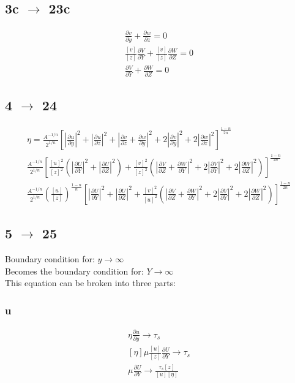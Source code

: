 \documentclass[10pt, letterpaper, twoside]{article}
\newcommand{\pd}[2]{\frac{\partial#1}{\partial#2}}
\begin{document}
	\subsection{3c $ \rightarrow $ 23c}
	\begin{gather*}
		\pd{v}{y} + \pd{w}{z} = 0 \tag{3c} \\
		\frac{\left[v\right]}{\left[z\right]}\pd{V}{Y} + \frac{\left[v\right]}{\left[z\right]}\pd{W}{Z} = 0\\
		\pd{V}{Y} + \pd{W}{Z} = 0 \tag{23c}
	\end{gather*}
	\subsection{4 $ \rightarrow $ 24}
	\begin{gather*}
		\eta = \frac{A^{-1/n}}{2^{1/n}}\left[\left|\pd{u}{y}\right|^2 + \left|\pd{u}{z}\right|^2 + \left|\pd{v}{z} + \pd{w}{y}\right|^2 + 2\left|\pd{v}{y}\right|^2 + 2\left|\pd{w}{z}\right|^2\right]^{\frac{1-n}{2n}} \tag{4} \\
		\frac{A^{-1/n}}{2^{1/n}}\left[\frac{\left[u\right]^2}{\left[z\right]^2}\left(\left|\pd{U}{Y}\right|^2 + \left|\pd{U}{Z}\right|^2\right) + \frac{\left[v\right]^2}{\left[z\right]^2}\left(\left|\pd{V}{Z} + \pd{W}{Y}\right|^2 + 2\left|\pd{V}{Y}\right|^2 + 2\left|\pd{W}{Z}\right|^2\right)\right]^{\frac{1-n}{2n}}\\
		\frac{A^{-1/n}}{2^{1/n}}\left(\frac{\left[u\right]}{\left[z\right]}\right)^{\frac{1-n}{n}}\left[\left|\pd{U}{Y}\right|^2 + \left|\pd{U}{Z}\right|^2 + \frac{\left[v\right]^2}{\left[u\right]^2}\left(\left|\pd{V}{Z} + \pd{W}{Y}\right|^2 + 2\left|\pd{V}{Y}\right|^2 + 2\left|\pd{W}{Z}\right|^2\right)\right]^{\frac{1-n}{2n}} \tag{4$'$}
	\end{gather*}
	\subsection{5 $ \rightarrow $ 25}
	Boundary condition for: $ y\rightarrow\infty $\\
	Becomes the boundary condition for: $ Y\rightarrow\infty$\\
	This equation can be broken into three parts:
	\subsubsection{u}
	\begin{gather*}
		\eta\pd{u}{y}\rightarrow\tau_s \tag{5a} \\
		\left[\eta\right]\mu\frac{\left[u\right]}{\left[z\right]}\pd{U}{Y}\rightarrow\tau_s\\
		\mu\pd{U}{Y}\rightarrow\frac{\tau_s\left[z\right]}{\left[u\right]\left[\eta\right]} \tag{5a$ ' $}
	\end{gather*}
\end{document}
